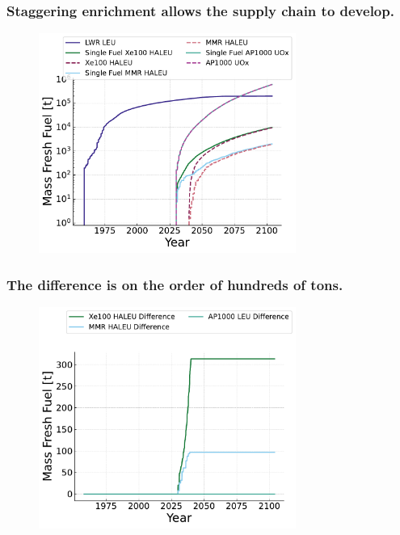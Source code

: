 \documentclass[9pt]{beamer}
\begin{document}
  \begin{frame}
    \frametitle{Staggering enrichment allows the supply chain to develop.}
    \begin{figure}
        \centering
        \includegraphics[width=0.75\textwidth]{images/fresh_fuel.pdf}
    \end{figure}
  \end{frame}

  \begin{frame}
    \frametitle{The difference is on the order of hundreds of tons.}
    \begin{figure}
        \centering
        \includegraphics[width=0.75\textwidth]{images/fresh_fuel_difference.pdf}
    \end{figure}
  \end{frame}
\end{document}
